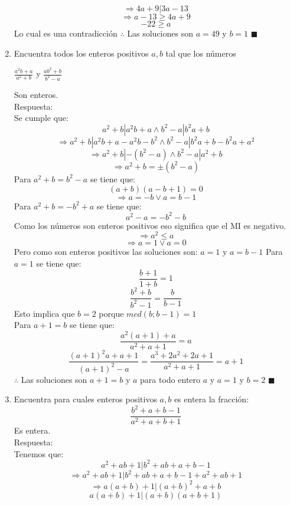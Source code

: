 \documentclass{book}
\begin{document}
\begin{enumerate}
          $$\Rightarrow 4a + 9 |3a- 13$$
          $$ \Rightarrow a- 13 \geq 4a + 9$$
          $$-22 \geq a $$
          Lo cual es una contradicción
          $\therefore$ Las soluciones son $a= 49$ y $   b = 1$ $\blacksquare$  \\
    \item Encuentra todos los enteros positivos $a,b$ tal que los números
          \begin{center}
              $\displaystyle\frac{a^2b+a}{a^2+b}$ y $\displaystyle\frac{ab^2+b}{b^2-a}$
          \end{center}
          Son enteros.\\
          Respuesta:\\
          Se cumple que:
          $$a^2 + b |a^2b + a\wedge b^2 - a| b^2a+ b $$
          $$ \Rightarrow a^2 + b| a^2b + a - a^2b - b^2 \wedge b^2 -a| b^2a + b - b^2a + a^2 $$
          $$ \Rightarrow a^2 + b| -(b^2 - a)  \wedge  b^2 - a |a^2 + b $$
          $$\Rightarrow a^2 + b = \pm(b^2 - a)$$
          Para $a^2 + b = b^2 - a$ se tiene que:
          $$(a + b)(a - b + 1) = 0$$
          $$\Rightarrow a=-b \vee a = b- 1$$
          Para $a^2 + b = -b^2 + a $ se tiene que:
          $$a^2 -a = -b^2 -b$$
          Como los números son enteros positivos eso significa que el MI es negativo.
          $$\Rightarrow a^2 \leq a$$
          $$\Rightarrow a= 1  \vee a= 0$$
          Pero como son enteros positivos las soluciones son:  $a= 1$  y $a= b- 1$
          Para $a= 1$ se tiene que:
          $$\frac{b + 1}{1 + b}=1$$
          $$\frac{b^2 + b}{b^2 - 1} =\frac{b}{b-1}$$
          Esto implica que $b= 2$ porque $mcd(b;b-1) = 1$ \\
          Para $a + 1 =b$ se tiene que:
          $$\frac{a^2(a + 1) + a}{ a^2 + a + 1}=a $$
          $$\frac{{(a + 1)}^2 a + a + 1}{{(a + 1)}^2 - a}=\frac{a^3 + 2a^2 + 2a + 1}{ a^2 + a + 1}= a + 1$$
          $\therefore$ Las soluciones son $a + 1 =b$ y $a$ para todo entero $a$ y $a= 1$ y $b= 2$ $\blacksquare$ \\
    \item  Encuentra para cuales enteros positivos $a,b$ es entera la fracción:
          $$\frac{b^2+a+b-1}{a^2+a+b+1}$$
          Es entera.\\
          Respuesta:\\
          Tenemos que: $$a^2 + ab + 1| b^2 + ab + a + b - 1$$
          $$\Rightarrow a^2 + ab + 1| b^2 + ab + a + b - 1 + a^2 + ab + 1 $$
          $$\Rightarrow a(a + b) + 1 |{(a + b)}^2 + a + b$$
          $$a(a + b) + 1| (a + b)(a + b + 1)$$

\end{enumerate}
\end{document}
